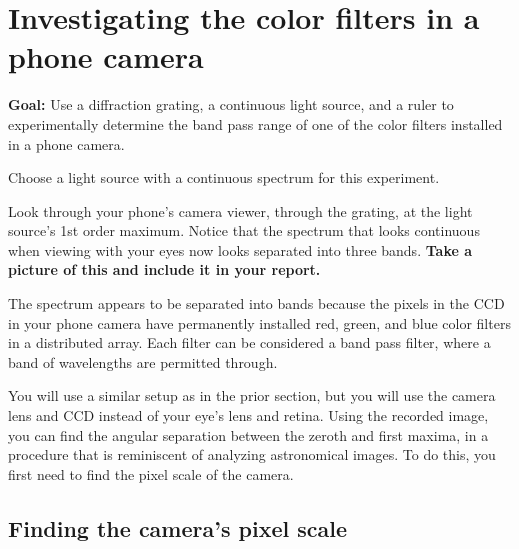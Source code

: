 \section{Investigating the color filters in a phone camera}

\textbf{Goal:} Use a diffraction grating, a continuous light source, and a ruler to experimentally determine the band pass range of one of the color filters installed in a phone camera.

\begin{steps}
	\item Choose a light source with a continuous spectrum for this experiment.
	
	\item Look through your phone's camera viewer, through the grating, at the light source's 1st order maximum. Notice that the spectrum that looks continuous when viewing with your eyes now looks separated into three bands. \textbf{Take a picture of this and include it in your report.}
\end{steps}

The spectrum appears to be separated into bands because the pixels in the CCD in your phone camera have permanently installed red, green, and blue color filters in a distributed array. Each filter can be considered a band pass filter, where a band of wavelengths are permitted through.

You will use a similar setup as in the prior section, but you will use the camera lens and CCD instead of your eye's lens and retina. Using the recorded image, you can find the angular separation between the zeroth and first maxima, in a procedure that is reminiscent of analyzing astronomical images. To do this, you first need to find the pixel scale of the camera.

\subsection{Finding the camera's pixel scale}

